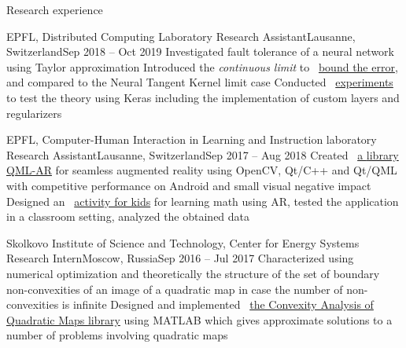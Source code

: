 \documentclass{resume} %
\newcommand*{\img}[1]{%
	\raisebox{-.02\baselineskip}{%
		\texttt{[image: \#1]}%
	}%
}
\newcommand*{\emoji}[1]{\img{./emoji/\imgpref#1.png}}
\newcommand*{\mybold}[1]{{\color{pinkunderline} #1}}
\def\imgpref{bleak-}
\newcommand{\mylink}{{\color{gray}\faExternalLink}}
\begin{document}
\begin{rSection}{Research experience}
	\begin{rSubsection}{EPFL, Distributed Computing Laboratory \emoji{flag-ch}}{Research Assistant}{Lausanne, Switzerland}{Sep 2018 -- Oct 2019}
		\myitem Investigated \mybold{fault tolerance} of a neural network using \mybold{Taylor approximation}
		\myitem Introduced the {\em continuous limit} to \mylink~\href{https://arxiv.org/abs/1902.01686}{bound the error}, and compared to the Neural Tangent Kernel limit case
		\myitem Conducted \mylink~\href{https://github.com/LPD-EPFL/ProbabilisticFaultToleranceNNs}{experiments} to test the theory using \mybold{Keras} including the \mybold{implementation} of custom layers and regularizers
	\end{rSubsection}

	\begin{rSubsection}{EPFL, Computer-Human Interaction in Learning and Instruction laboratory \emoji{flag-ch}}{Research Assistant}{Lausanne, Switzerland}{Sep 2017 -- Aug 2018}
		\myitem Created \mylink~\href{https://github.com/chili-epfl/qml-ar}{a \mybold{library} QML-AR} for seamless \mybold{augmented reality} using \mybold{OpenCV, Qt/C++ and Qt/QML} with competitive performance on Android and small visual negative impact
		\myitem Designed an \mylink~\href{https://youtu.be/B4-2qYsAKH4}{activity for kids} for learning math using AR, tested the application in a classroom setting, analyzed the obtained data
	\end{rSubsection}

	\begin{rSubsection}{Skolkovo Institute of Science and Technology, Center for Energy Systems \emoji{flag-ru}}{Research Intern}{Moscow, Russia}{Sep 2016 -- Jul 2017}
		\myitem Characterized using \mybold{numerical optimization} and \mybold{theoretically} the structure of the set of boundary non-convexities of an image of a quadratic map in case the number of non-convexities is infinite
		\myitem Designed and implemented \mylink~\href{https://github.com/sergeivolodin/CAQM}{the Convexity Analysis of Quadratic Maps \mybold{library}} using \mybold{MATLAB} which gives approximate solutions to a number of problems involving quadratic maps
	\end{rSubsection}



\end{rSection}
\end{document}
